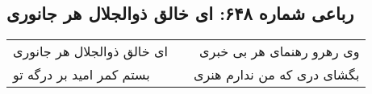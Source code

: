 \begin{center}
\section*{رباعی شماره ۶۴۸: ای خالق ذوالجلال هر جانوری}
\label{sec:sh648}
\begin{longtable}{l p{0.5cm} r}
ای خالق ذوالجلال هر جانوری
&&
وی رهرو رهنمای هر بی خبری
\\
بستم کمر امید بر درگه تو
&&
بگشای دری که من ندارم هنری
\\
\end{longtable}
\end{center}
